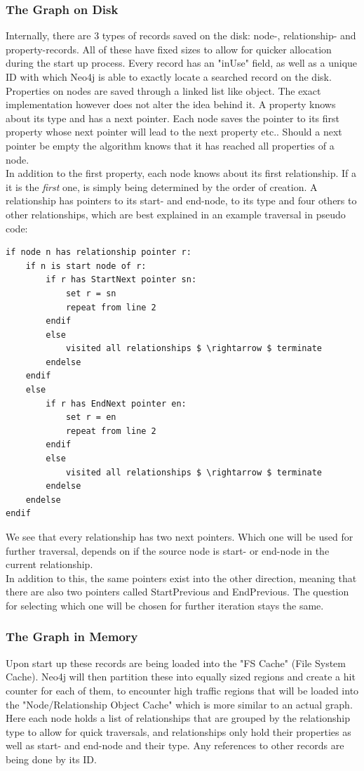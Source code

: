\subsubsection{The Graph on Disk}
Internally, there are 3 types of records saved on the disk: node-, relationship- and property-records. All of these have fixed sizes to allow for quicker allocation during the start up process. Every record has an "inUse" field, as well as a unique ID with which Neo4j is able to exactly locate a searched record on the disk. \citep[minute 08]{NeoInternals} \\
Properties on nodes are saved through a linked list like object. The exact implementation however does not alter the idea behind it. A property knows about its type and has a next pointer. Each node saves the pointer to its first property whose next pointer will lead to the next property etc.. Should a next pointer be empty the algorithm knows that it has reached all properties of a node. \\
In addition to the first property, each node knows about its first relationship. If a it is the \emph{first} one, is simply being determined by the order of creation. A relationship has pointers to its start- and end-node, to its type and four others to other relationships, which are best explained in an example traversal in pseudo code:
\begin{lstlisting}
if node n has relationship pointer r: 
	if n is start node of r: 
		if r has StartNext pointer sn: 
			set r = sn 
			repeat from line 2 
		endif 
		else  
			visited all relationships $ \rightarrow $ terminate
		endelse 
	endif 
	else 
		if r has EndNext pointer en: 
			set r = en 
			repeat from line 2 
		endif 
		else
			visited all relationships $ \rightarrow $ terminate
		endelse 
	endelse 
endif
\end{lstlisting}

\noindent
We see that every relationship has two next pointers. Which one will be used for further traversal, depends on if the source node is start- or end-node in the current relationship. \\
In addition to this, the same pointers exist into the other direction, meaning that there are also two pointers called StartPrevious and EndPrevious. The question for selecting which one will be chosen for further iteration stays the same.

\subsubsection{The Graph in Memory}
Upon start up these records are being loaded into the "FS Cache" (File System Cache). Neo4j will then partition these into equally sized regions and create a hit counter for each of them, to encounter high traffic regions that will be loaded into the "Node/Relationship Object Cache" which is more similar to an actual graph. \\
Here each node holds a list of relationships that are grouped by the relationship type to allow for quick traversals, and relationships only hold their properties as well as start- and end-node and their type. Any references to other records are being done by its ID. 

